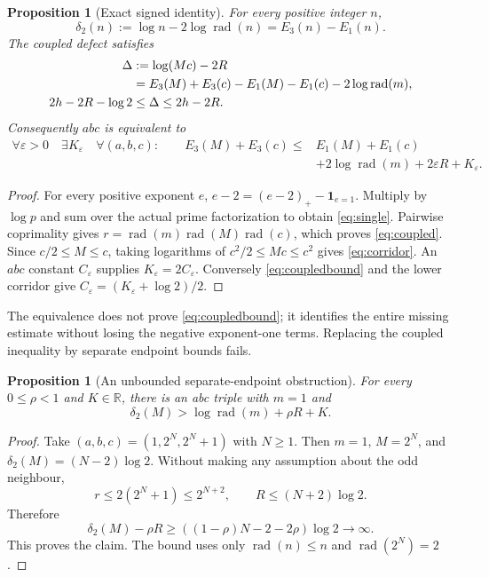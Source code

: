 \documentclass[11pt]{amsart}
\newtheorem{proposition}[theorem]{Proposition}
\theoremstyle{definition}
\theoremstyle{remark}
\newcommand{\R}{\mathbb R}
\newcommand{\rad}{\operatorname{rad}}
\newcommand{\eps}{\varepsilon}
\newcommand{\pospart}[1]{\left(#1\right)_+}
\begin{document}
\begin{proposition}[Exact signed identity]\label{prop:signed}
For every positive integer $n$,
\begin{equation}\label{eq:single}
 \delta_2(n):=\log n-2\log\rad(n)=E_3(n)-E_1(n).
\end{equation}
The coupled defect satisfies
\begin{align}
 \Delta&:=\log(Mc)-2R\notag\\
 &=E_3(M)+E_3(c)-E_1(M)-E_1(c)-2\log\rad(m),\label{eq:coupled}\\
 2h-2R-\log2&\le\Delta\le2h-2R.\label{eq:corridor}
\end{align}
Consequently $abc$ is equivalent to
\begin{equation}\label{eq:coupledbound}
 \begin{split}
 \forall\eps>0\quad\exists K_\eps\quad\forall(a,b,c):\qquad
 E_3(M)+E_3(c)\le{}&E_1(M)+E_1(c)\\
 &+2\log\rad(m)+2\eps R+K_\eps.
 \end{split}
\end{equation}
\end{proposition}
\begin{proof}
For every positive exponent $e$,
$e-2=\pospart{e-2}-\mathbf1_{e=1}$. Multiply by $\log p$ and sum over the
actual prime factorization to obtain \eqref{eq:single}.
Pairwise coprimality gives
$r=\rad(m)\rad(M)\rad(c)$, which proves \eqref{eq:coupled}.
Since $c/2\le M\le c$, taking logarithms of
$c^2/2\le Mc\le c^2$ gives \eqref{eq:corridor}.
An $abc$ constant $C_\eps$ supplies $K_\eps=2C_\eps$.
Conversely \eqref{eq:coupledbound} and the lower corridor give
$C_\eps=(K_\eps+\log2)/2$.
\end{proof}

The equivalence does not prove \eqref{eq:coupledbound}; it identifies the
entire missing estimate without losing the negative exponent-one terms.
Replacing the coupled inequality by separate endpoint bounds fails.

\begin{proposition}[An unbounded separate-endpoint obstruction]\label{prop:dyadic}
For every $0\le\rho<1$ and $K\in\R$, there is an abc triple with $m=1$ and
\[
 \delta_2(M)>\log\rad(m)+\rho R+K.
\]
\end{proposition}
\begin{proof}
Take $(a,b,c)=(1,2^N,2^N+1)$ with $N\ge1$.
Then $m=1$, $M=2^N$, and $\delta_2(M)=(N-2)\log2$.
Without making any assumption about the odd neighbour,
\[
 r\le2(2^N+1)\le2^{N+2},\qquad R\le(N+2)\log2.
\]
Therefore
\[
 \delta_2(M)-\rho R\ge
 ((1-\rho)N-2-2\rho)\log2\longrightarrow\infty.
\]
This proves the claim. The bound uses only $\rad(n)\le n$ and
$\rad(2^N)=2$.
\end{proof}
\end{document}
